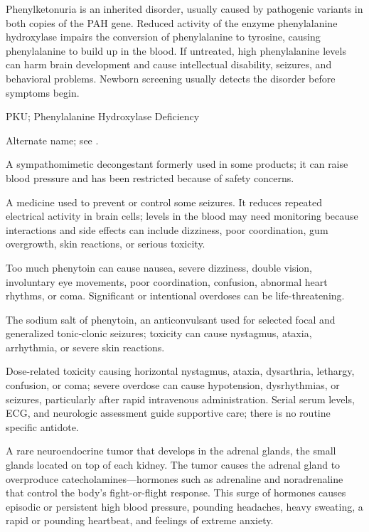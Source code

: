  Phenylketonuria is an inherited disorder, usually caused by pathogenic variants in both copies of the PAH gene. Reduced activity of the enzyme phenylalanine hydroxylase impairs the conversion of phenylalanine to tyrosine, causing phenylalanine to build up in the blood. If untreated, high phenylalanine levels can harm brain development and cause intellectual disability, seizures, and behavioral problems. Newborn screening usually detects the disorder before symptoms begin.

\synonyms
PKU; Phenylalanine Hydroxylase Deficiency

 Alternate name; see .

 A sympathomimetic decongestant formerly used in some products; it can raise blood pressure and has been restricted because of safety concerns.

 A medicine used to prevent or control some seizures. It reduces repeated electrical activity in brain cells; levels in the blood may need monitoring because interactions and side effects can include dizziness, poor coordination, gum overgrowth, skin reactions, or serious toxicity.

 Too much phenytoin can cause nausea, severe dizziness, double vision, involuntary eye movements, poor coordination, confusion, abnormal heart rhythms, or coma. Significant or intentional overdoses can be life-threatening.

 The sodium salt of phenytoin, an anticonvulsant used for selected focal and generalized tonic-clonic seizures; toxicity can cause nystagmus, ataxia, arrhythmia, or severe skin reactions.

 Dose-related toxicity causing horizontal nystagmus, ataxia, dysarthria, lethargy, confusion, or coma; severe overdose can cause hypotension, dysrhythmias, or seizures, particularly after rapid intravenous administration. Serial serum levels, ECG, and neurologic assessment guide supportive care; there is no routine specific antidote.

 A rare neuroendocrine tumor that develops in the adrenal glands, the small glands located on top of each kidney. The tumor causes the adrenal gland to overproduce catecholamines---hormones such as adrenaline and noradrenaline that control the body's fight-or-flight response. This surge of hormones causes episodic or persistent high blood pressure, pounding headaches, heavy sweating, a rapid or pounding heartbeat, and feelings of extreme anxiety.

